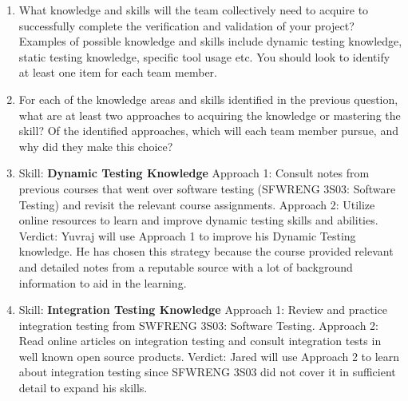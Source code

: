 \documentclass[12pt, titlepage]{article}
\begin{document}
	\begin{enumerate}
		\item What knowledge and skills will the team collectively need to acquire to
		successfully complete the verification and validation of your project?
		Examples of possible knowledge and skills include dynamic testing knowledge,
		static testing knowledge, specific tool usage etc.  You should look to
		identify at least one item for each team member.
		\item For each of the knowledge areas and skills identified in the previous
		question, what are at least two approaches to acquiring the knowledge or
		mastering the skill?  Of the identified approaches, which will each team
		member pursue, and why did they make this choice?
		\item Skill: \textbf{Dynamic Testing Knowledge}
		Approach 1: Consult notes from previous courses that went over software testing (SFWRENG 3S03: Software Testing) and revisit the relevant course assignments.
		Approach 2: Utilize online resources to learn and improve dynamic testing skills and abilities.
		Verdict: Yuvraj will use Approach 1 to improve his Dynamic Testing knowledge. He has chosen this strategy because the course provided relevant and detailed notes from a reputable source with a lot of background information to aid in the learning.
		\item Skill: \textbf{Integration Testing Knowledge}
		Approach 1: Review and practice integration testing from SWFRENG 3S03: Software Testing.
		Approach 2: Read online articles on integration testing and consult integration tests in well known open source products.
		Verdict: Jared will use Approach 2 to learn about integration testing since SFWRENG 3S03 did not cover it in sufficient detail to expand his skills.
	\end{enumerate}
	
\end{document}
